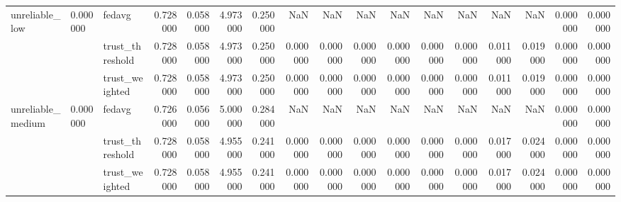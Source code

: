\begin{tabular}{lllrrrrrrrrrrrrrr}
\cline{1-17} \cline{2-17}
\multirow[t]{3}{*}{unreliable_low} & \multirow[t]{3}{*}{0.000000} & fedavg & 0.728000 & 0.058000 & 4.973000 & 0.250000 & NaN & NaN & NaN & NaN & NaN & NaN & NaN & NaN & 0.000000 & 0.000000 \\
 &  & trust_threshold & 0.728000 & 0.058000 & 4.973000 & 0.250000 & 0.000000 & 0.000000 & 0.000000 & 0.000000 & 0.000000 & 0.000000 & 0.011000 & 0.019000 & 0.000000 & 0.000000 \\
 &  & trust_weighted & 0.728000 & 0.058000 & 4.973000 & 0.250000 & 0.000000 & 0.000000 & 0.000000 & 0.000000 & 0.000000 & 0.000000 & 0.011000 & 0.019000 & 0.000000 & 0.000000 \\
\cline{1-17} \cline{2-17}
\multirow[t]{3}{*}{unreliable_medium} & \multirow[t]{3}{*}{0.000000} & fedavg & 0.726000 & 0.056000 & 5.000000 & 0.284000 & NaN & NaN & NaN & NaN & NaN & NaN & NaN & NaN & 0.000000 & 0.000000 \\
 &  & trust_threshold & 0.728000 & 0.058000 & 4.955000 & 0.241000 & 0.000000 & 0.000000 & 0.000000 & 0.000000 & 0.000000 & 0.000000 & 0.017000 & 0.024000 & 0.000000 & 0.000000 \\
 &  & trust_weighted & 0.728000 & 0.058000 & 4.955000 & 0.241000 & 0.000000 & 0.000000 & 0.000000 & 0.000000 & 0.000000 & 0.000000 & 0.017000 & 0.024000 & 0.000000 & 0.000000 \\
\cline{1-17} \cline{2-17}
\bottomrule
\end{tabular}
